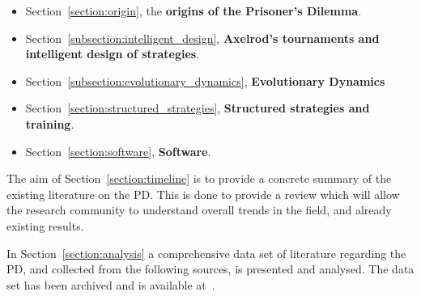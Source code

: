 \documentclass{article}
\theoremstyle{definition}
\begin{document}
\begin{itemize}
    \item Section~\ref{section:origin}, the \textbf{origins of the Prisoner's
    Dilemma}.
    \item Section~\ref{subsection:intelligent_design}, \textbf{Axelrod's
    tournaments and intelligent design of strategies}.
    \item Section~\ref{subsection:evolutionary_dynamics}, \textbf{Evolutionary Dynamics}
    \item Section~\ref{section:structured_strategies}, \textbf{Structured
    strategies and training}.
    \item Section~\ref{section:software}, \textbf{Software}.
\end{itemize}

The aim of Section~\ref{section:timeline} is to provide a concrete summary of
the existing literature on the PD. This is done to provide a review which will
allow the research community to understand overall trends in the field, and
already existing results.

In Section~\ref{section:analysis} a comprehensive data set of literature
regarding the PD, and collected from the following sources, is presented and
analysed. The data set has been archived and is available at~\cite{pd_data_2018}.
\end{document}
